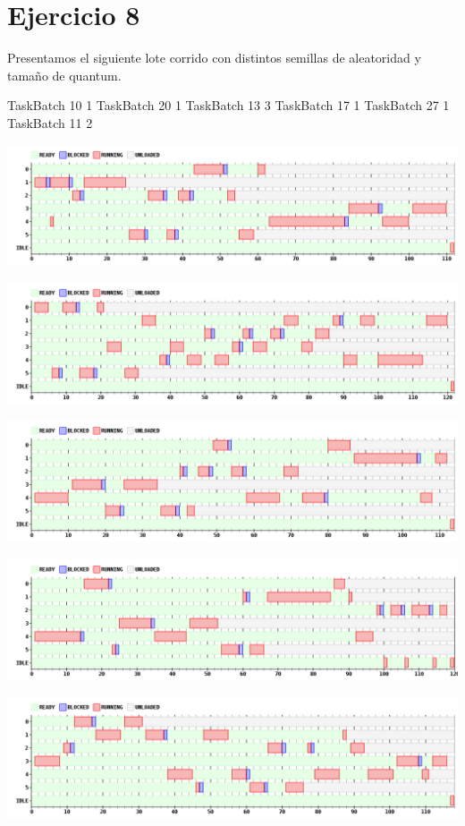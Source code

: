 \section{Ejercicio 8}

Presentamos el siguiente lote corrido con distintos semillas de aleatoridad y tamaño de quantum.

TaskBatch 10 1
TaskBatch 20 1
TaskBatch 13 3
TaskBatch 17 1
TaskBatch 27 1
TaskBatch 11 2

\begin {center}
\includegraphics[width=16cm]{../simusched/outputs/loterya.png}
\end {center}
\begin {center}
\includegraphics[width=16cm]{../simusched/outputs/loteryc.png}
\end {center}
\begin {center}
\includegraphics[width=16cm]{../simusched/outputs/loteryd.png}
\end {center}
\begin {center}
\includegraphics[width=16cm]{../simusched/outputs/loterye.png}
\end {center}
\begin {center}
\includegraphics[width=16cm]{../simusched/outputs/loteryf.png}
\end {center}



